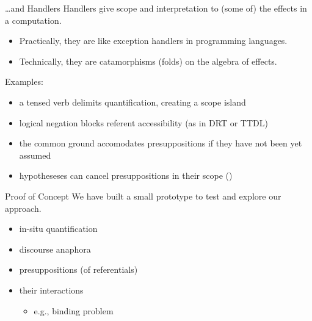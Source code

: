\documentclass{beamer}
\begin{document}
\begin{frame}{\ldots and Handlers}
  Handlers give scope and interpretation to (some of) the effects in a
  computation.

  \begin{itemize}
  \item Practically, they are like exception handlers in programming languages.
  \item Technically, they are catamorphisms (folds) on the algebra of effects.
  \end{itemize}
  

  \pause
  \vfill 

  Examples:
  \begin{itemize}
  \item a tensed verb delimits quantification, creating a scope island
  \item logical negation blocks referent accessibility (as in DRT or TTDL)
  \item the common ground accomodates presuppositions if they have not been
    yet assumed
  \item hypotheseses can cancel presuppositions in their scope ()
  \end{itemize}
\end{frame}

\begin{frame}{Proof of Concept}
  \vfill
  We have built a small prototype to test and explore our approach.
  \vfill
  \begin{itemize}
  \item in-situ quantification
  \item discourse anaphora
  \item presuppositions (of referentials)
  \item their interactions
    \begin{itemize}
    \item e.g., binding problem
    \end{itemize}
  \end{itemize}
  \vfill
\end{frame}
\end{document}
